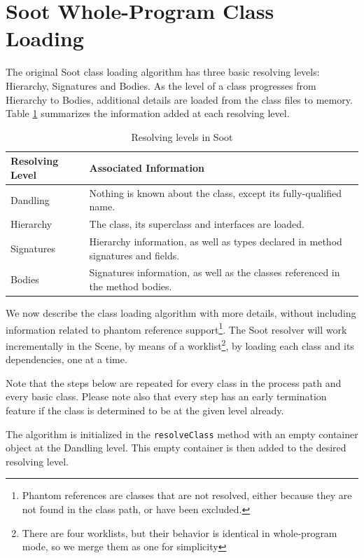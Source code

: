 \documentclass[preprint]{sigplanconf}
\begin{document}
\section{Soot Whole-Program Class Loading}
\label{sec:soot-cl}

The original Soot class loading algorithm has three basic resolving levels: Hierarchy, Signatures and Bodies. As the level of a class progresses from Hierarchy to Bodies, additional details are loaded from the class files to memory. Table \ref{tbl:resolving_levels} summarizes the information added at each resolving level. 

\begin{table}
\begin{tabularx}{\columnwidth}{|l|X|}
\hline
\textbf{Resolving Level} & \textbf{Associated Information} \\\hline
Dandling  & Nothing is known about the class, except its fully-qualified name.\\\hline
Hierarchy & The class, its superclass and interfaces are loaded. \\\hline
Signatures & Hierarchy information, as well as types declared in method signatures and fields. \\\hline
Bodies & Signatures information, as well as the classes referenced in the method bodies. \\\hline
\end{tabularx}
\caption{Resolving levels in Soot}
\label{tbl:resolving_levels}
\end{table}

We now describe the class loading algorithm with more details, without including information related to phantom reference support\footnote{Phantom references are classes that are not resolved, either because they are not found in the class path, or have been excluded.}.
The Soot resolver will work incrementally in the Scene, by means of a worklist\footnote{There are four worklists, but their behavior is identical in whole-program mode, so we merge them as one for simplicity}, by loading each class and its dependencies, one at a time.

Note that the steps below are repeated for every class in the process path and every basic class. Please note also that every step has an early termination feature if the class is determined to be at the given level already.

The algorithm is initialized in the {\tt resolveClass} method with an empty \sootclass container object at the Dandling level. This empty container is then added to the desired resolving level.
\end{document}
